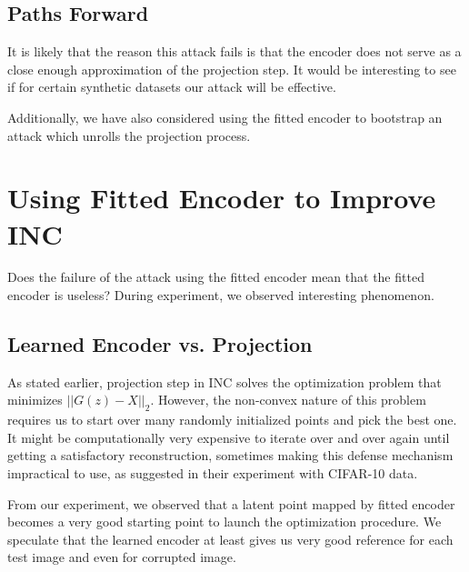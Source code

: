 \documentclass[twoside]{article}
\theoremstyle{definition}
\begin{document}
\subsection{Paths Forward}
It is likely that the reason this attack fails is that the encoder does not serve as a close enough approximation of the projection step. It would be interesting to see if for certain synthetic datasets our attack will be effective.

Additionally, we have also considered using the fitted encoder to bootstrap an attack which unrolls the projection process.

\section{Using Fitted Encoder to Improve INC}
Does the failure of the attack using the fitted encoder mean that the fitted encoder is useless? During experiment, we observed interesting phenomenon. 

\subsection{Learned Encoder vs. Projection}
As stated earlier, projection step in INC solves the optimization problem that minimizes $||G(z) - X||_2$. However, the non-convex nature of this problem requires us to start over many randomly initialized points and pick the best one. It might be computationally very expensive to iterate over and over again until getting a satisfactory reconstruction, sometimes making this defense mechanism impractical to use, as suggested in their experiment with CIFAR-10 data. 

From our experiment, we observed that a latent point mapped by fitted encoder becomes a very good starting point to launch the optimization procedure. We speculate that the learned encoder at least gives us very good reference for each test image and even for corrupted image.
\end{document}
